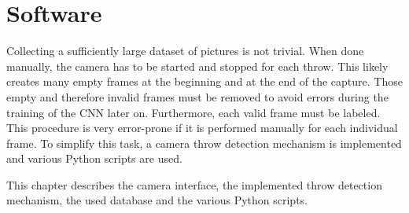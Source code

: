 \section{Software}
\label{sec:software}

Collecting a sufficiently large dataset of pictures is not trivial.
When done manually, the camera has to be started and stopped for each throw.
This likely creates many empty frames at the beginning and at the end of the capture.
Those empty and therefore invalid frames must be removed to avoid errors during the training of the CNN later on.
Furthermore, each valid frame must be labeled.
This procedure is very error-prone if it is performed manually for each individual frame.
To simplify this task, a camera throw detection mechanism is implemented and various Python scripts are used.

This chapter describes the camera interface, the implemented throw detection mechanism, the used database and the various Python scripts.




\clearpage

